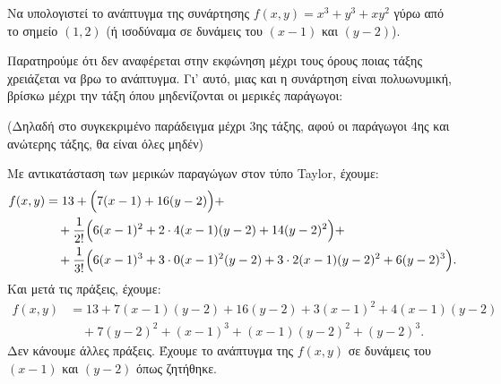 \begin{example}
  Να υπολογιστεί το ανάπτυγμα της συνάρτησης $f(x,y)=x^3+y^3+xy^2$ γύρω από το 
  σημείο $ (1,2) $ (ή ισοδύναμα σε δυνάμεις του $(x-1)$ και $(y-2)$).
\end{example}
\begin{solution}
  Παρατηρούμε ότι δεν αναφέρεται στην εκφώνηση μέχρι τους όρους ποιας τάξης 
  χρειάζεται να βρω το ανάπτυγμα.  Γι' αυτό, μιας και η συνάρτηση είναι πολυωνυμική,
  βρίσκω μέχρι την τάξη όπου μηδενίζονται οι μερικές παράγωγοι: 

  (Δηλαδή στο συγκεκριμένο παράδειγμα μέχρι $3$ης τάξης, αφού οι παράγωγοι 
  $4$ης και ανώτερης τάξης, θα είναι όλες μηδέν)

  \vspace{\baselineskip}


  \vspace{\baselineskip}

  Με αντικατάσταση των μερικών παραγώγων στον τύπο Taylor, έχουμε:
  \begin{align*}
    f(x,y)&=13+\Bigl(7(x-1)+16(y-2)\Bigr)+ \\ 
          &\quad +\frac{1}{2!}\Bigl(6(x-1)^2 +2\cdot 4(x-1)(y-2)+14(y-2)^2\Bigr)+ \\
          &\quad +\frac{1}{3!}\Bigl(6(x-1)^3+3\cdot 0(x-1)^2(y-2)+3
          \cdot 2(x-1)(y-2)^2+6(y-2)^3\Bigr).
  \end{align*}
  Και μετά τις πράξεις, έχουμε: 
  \begin{align*}
    f(x,y)&=13+7(x-1)(y-2)+16(y-2)+3(x-1)^2+4(x-1)(y-2) \\
          &\quad +7(y-2)^2+(x-1)^3+(x-1)(y-2)^2+(y-2)^3.
  \end{align*}
  Δεν κάνουμε άλλες πράξεις.
  Έχουμε το ανάπτυγμα της $f(x,y)$ σε δυνάμεις του $(x-1)$ και $(y-2)$ όπως ζητήθηκε.
\end{solution}


